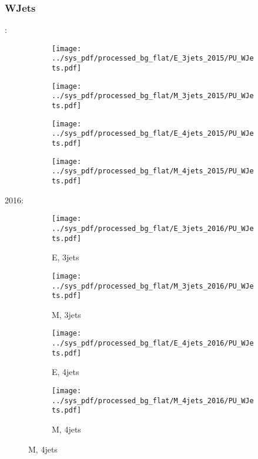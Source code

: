 \documentclass{beamer}
\begin{document}
\begin{frame}
\frametitle{WJets}
\fontsize{5}{1}:
\begin{figure}
\centering
\begin{subfigure}[b]{0.24\textwidth}
\texttt{[image: ../sys\_pdf/processed\_bg\_flat/E\_3jets\_2015/PU\_WJets.pdf]}
\end{subfigure}
\begin{subfigure}[b]{0.24\textwidth}
\texttt{[image: ../sys\_pdf/processed\_bg\_flat/M\_3jets\_2015/PU\_WJets.pdf]}
\end{subfigure}
\begin{subfigure}[b]{0.24\textwidth}
\texttt{[image: ../sys\_pdf/processed\_bg\_flat/E\_4jets\_2015/PU\_WJets.pdf]}
\end{subfigure}
\begin{subfigure}[b]{0.24\textwidth}
\texttt{[image: ../sys\_pdf/processed\_bg\_flat/M\_4jets\_2015/PU\_WJets.pdf]}
\end{subfigure}
\end{figure}
2016:
\begin{figure}
\centering
\begin{subfigure}[b]{0.24\textwidth}
\texttt{[image: ../sys\_pdf/processed\_bg\_flat/E\_3jets\_2016/PU\_WJets.pdf]}
\captionsetup{font=tiny}
\caption{E, 3jets}
\end{subfigure}
\begin{subfigure}[b]{0.24\textwidth}
\texttt{[image: ../sys\_pdf/processed\_bg\_flat/M\_3jets\_2016/PU\_WJets.pdf]}
\captionsetup{font=tiny}
\caption{M, 3jets}
\end{subfigure}
\begin{subfigure}[b]{0.24\textwidth}
\texttt{[image: ../sys\_pdf/processed\_bg\_flat/E\_4jets\_2016/PU\_WJets.pdf]}
\captionsetup{font=tiny}
\caption{E, 4jets}
\end{subfigure}
\begin{subfigure}[b]{0.24\textwidth}
\texttt{[image: ../sys\_pdf/processed\_bg\_flat/M\_4jets\_2016/PU\_WJets.pdf]}
\captionsetup{font=tiny}
\caption{M, 4jets}
\end{subfigure}
\end{figure}
\end{frame}
\end{document}
